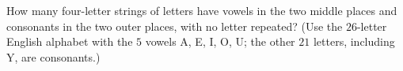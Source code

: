 How many four-letter strings of letters have vowels in the two middle places and consonants in the two outer places, with no letter repeated? (Use the $26$-letter English alphabet with the $5$ vowels A, E, I, O, U; the other $21$ letters, including Y, are consonants.)
